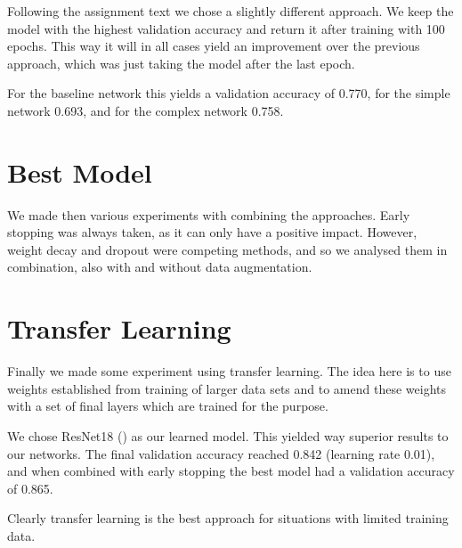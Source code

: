 \documentclass[sigconf,nonacm]{acmart}
\begin{document}
Following the assignment text we chose a slightly different
approach.
We keep the model with the highest validation accuracy 
and return it after training with 100 epochs.
This way it will in all cases yield an improvement over
the previous approach, which was just taking the model
after the last epoch.

For the baseline network this yields a validation accuracy
of 0.770, for the simple network 0.693, and for the
complex network 0.758.

\section{Best Model}

We made then various experiments with combining the
approaches.
Early stopping was always taken, as it can only have
a positive impact.
However, weight decay and dropout were competing
methods, and so we analysed them in combination,
also with and without data augmentation.

\section{Transfer Learning}

Finally we made some experiment using transfer
learning.
The idea here is to use weights established from training
of larger data sets and to amend these weights with
a set of final layers which are trained for the purpose.

We chose ResNet18 (\cite{resnet2015}) as our learned
model.
This yielded way superior results to our networks.
The final validation accuracy reached 0.842 (learning
rate 0.01), and when combined with early stopping the best
model had a validation accuracy of 0.865.

Clearly transfer learning is the best approach for
situations with limited training data.



\end{document}

